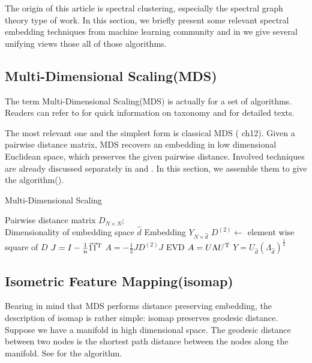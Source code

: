 The origin of this article is spectral clustering, 
especially the spectral graph theory type of work. 
In this section, we 
briefly present some relevant spectral embedding techniques 
from machine learning community and in 
\rsec{\ref{sec:unify}} we give several unifying views
those all of those algorithms. 

\subsection{Multi-Dimensional Scaling(MDS)}
\label{sec:mds}

The term Multi-Dimensional Scaling(MDS) 
\cite{cox2008mds} is actually for a set of algorithms. 
Readers can refer to \cite{wiki_mds} for quick information
on taxonomy and 
\cite{borg2005modern} for detailed texts. 

The most relevant one and the simplest form is classical MDS
(\cite{borg2005modern} ch12). Given a pairwise distance matrix, 
MDS recovers an embedding in low dimensional Euclidean space, 
which preserves the given pairwise distance. 
Involved techniques are already discussed separately in 
\rsec{\ref{sec:proximity}} and \rsec{\ref{sec:lrapprox}}. In 
this section, we assemble them to give the algorithm(\ralg{\ref{alg:mds}}). 

\begin{algorithm}[htb]
	\caption{Multi-Dimensional Scaling}
	\label{alg:mds}
	\begin{algorithmic}[1]
		\REQUIRE Pairwise distance matrix $ D_{N \times N} $; \\
			Dimensionality of embedding space $ \hat{d} $
		\ENSURE Embedding $ Y_{N \times \hat{d}} $
		\STATE $ D^{(2)} \leftarrow$ element wise square of $ D $
		\STATE $ J = I - \frac{1}{n} \vec{1} \vec{1}^\mathrm{T} $
		\STATE $ A = -\frac{1}{2}JD^{(2)}J $
		\STATE EVD $ A = U \Lambda U^\mathrm{T} $ 
		\STATE $ Y = U_{\hat{d}} (\Lambda_{\hat{d}})^{\frac{1}{2}} $
	\end{algorithmic}
\end{algorithm}

\subsection{Isometric Feature Mapping(isomap)}
\label{sec:isomap}

Bearing in mind that MDS performs distance preserving 
embedding, the description of isomap \cite{tenenbaum2000isomap}
is rather simple: isomap preserves geodesic distance. 
Suppose we have a manifold in high dimensional space. 
The geodesic distance between two nodes 
is the shortest path distance between the nodes 
along the manifold. 
See \ralg{\ref{alg:isomap}} for the algorithm. 

